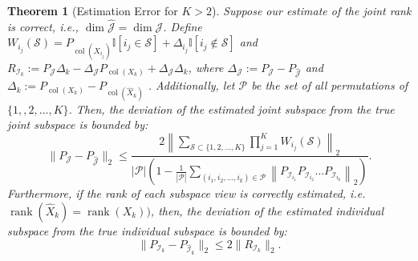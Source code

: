 \documentclass{amsart}
\def\Id{\mathbb{I}} %
\DeclareMathOperator*{\col}{col}
\DeclareMathOperator*{\rank}{rank}
\newcommand{\Scal}{\mathcal{S}}
\newcommand{\Pcal}{\mathcal{P}}
\newcommand{\Jcal}{\mathcal{J}}
\newcommand{\Ical}{\mathcal{I}}
\newtheorem{theorem}{Theorem}[section]
\begin{document}
\begin{theorem}[Estimation Error for $K>2$]
\label{thm:subspace_est_multiview}
Suppose our estimate of the joint rank is correct, i.e., $\dim \widehat{\Jcal} = \dim \Jcal$. Define $W_{i_j}(\Scal) = P_{\col(X_{i_j})} \Id[i_j\in \Scal] + \Delta_{i_j}\Id[i_j\not\in \Scal]$ and  {$R_{\Ical_k} := P_{\Jcal} \Delta_k - \Delta_{\Jcal} P_{\col(X_k)} + \Delta_{\Jcal} \Delta_k$, where $\Delta_{\Jcal} :=  P_{\Jcal} - P_{\widehat{\Jcal}}$} and $\Delta_k := P_{{\col (X_k)}} - P_{\col (\widehat{X}_k)}$ .
Additionally, let $\Pcal$ be the set of all permutations of $\{1,, 2, \dots, K\}$. Then, the deviation of the estimated joint subspace from the true joint subspace is bounded by:
$$\|P_{\Jcal} - P_{\widehat{\Jcal}} \|_2 \leq \frac{{2} \left\|\sum_{\Scal \subset \{1, 2, \dots, K\}} \prod_{j=1}^K W_{i_j}(\Scal) \right\|_2}{|\Pcal| \left(1-\frac{1}{|\Pcal|} \sum_{(i_1, i_2, \dots, i_k)\in \Pcal} \left\| P_{\Ical_{i_1}}P_{\Ical_{i_2}}\dots P_{\Ical_{i_k}}\right\|_2\right)}.$$
Furthermore, if the rank of each subspace view is correctly estimated, i.e. $\rank(\widehat{X}_k) = \rank(X_k))$, then, the deviation of the estimated individual subspace from the true individual subspace is bounded by: 
$$\|  P_{\Ical_k} - P_{\widehat{\Ical}_k}\|_2 \leq  {2} \|R_{\Ical_k}\|_2.$$
\end{theorem}
\end{document}

